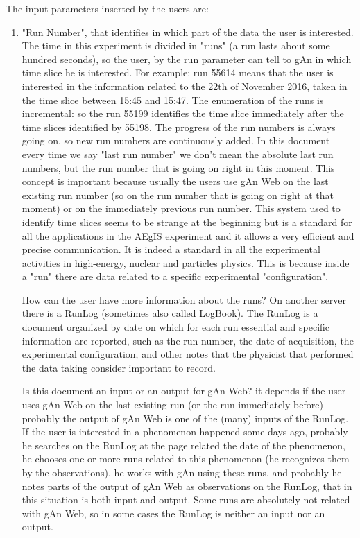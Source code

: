 The input parameters inserted by the users are:
\begin{enumerate}

\item "Run Number", that identifies in which part of the data the user is interested. 
The time in this experiment is divided in "runs" (a run lasts about some hundred seconds), so the user, by the run parameter can tell to gAn in which time slice he is interested. For example: run 55614 means that the user is interested in the information related to the 22th of November 2016, taken in the time slice between 15:45 and 15:47. 
The enumeration of the runs is incremental: so the run 55199 identifies the time slice immediately after the time slices identified by 55198. The progress of the run numbers is always going on, so new run numbers are continuously added. 
In this document every time we say "last run number" we don't mean the absolute last run numbers, but the run number that is going on right in this moment. This concept is important because usually the users use gAn Web on the last existing run number (so on the run number that is going on right at that moment) or on the immediately previous run number.  
This system used to identify time slices seems to be strange at the beginning but is a standard for all the applications in the AEgIS experiment and it allows a very efficient and precise communication. It is indeed a standard in all the experimental activities in high-energy, nuclear and particles physics. This is because inside a "run" there are data related to a specific experimental "configuration".

How can the user have more information about the runs? 
On another server there is a RunLog (sometimes also called LogBook). The RunLog is a document organized by date on which for each run essential and specific information are reported, such as the run number, the date of acquisition, the experimental configuration, and other notes that the physicist that performed the data taking consider important to record.

Is this document an input or an output for gAn Web? it depends if the user uses gAn Web on the last existing run (or the run immediately before) probably the output of gAn Web is one of the (many) inputs of the RunLog.  
If the user is interested in a phenomenon happened some days ago, probably he searches on the RunLog at the page related the date of the phenomenon, he chooses one or more runs related to this phenomenon (he recognizes them by the observations), he works with gAn using these runs, and probably he notes parts of the output of gAn Web as observations on the RunLog, that in this situation is both input and output. Some runs are absolutely not related with gAn Web, so in some cases the RunLog is neither an input nor an output.  


\end{enumerate}
